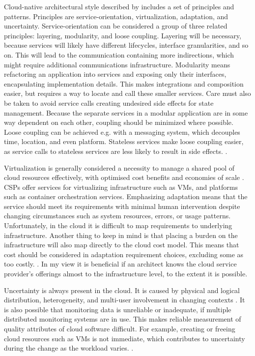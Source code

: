 \documentclass[utf8,english]{gradu3}
\begin{document}
Cloud-native architectural style described by \textcite[5]{Pahl2018} includes a
set of principles and patterns. Principles are service-orientation,
virtualization, adaptation, and uncertainty. Service-orientation can be
considered a group of three related principles: layering, modularity, and loose
coupling. Layering will be necessary, because services will likely have
different lifecycles, interface granularities, and so on. This will lead to the
communication containing more indirections, which might require additional
communications infrastructure. Modularity means refactoring an application into
services and exposing only their interfaces, encapsulating implementation
details. This makes integrations and composition easier, but requires a way to
locate and call these smaller services. Care must also be taken to avoid service
calls creating undesired side effects for state management. Because the separate
services in a modular application are in some way dependent on each other,
coupling should be minimized where possible. Loose coupling can be achieved e.g.
with a messaging system, which decouples time, location, and even platform.
Stateless services make loose coupling easier, as service calls to stateless
services are less likely to result in side effects. \parencite[3-8]{Pahl2018}.

Virtualization is generally considered a necessity to manage a shared pool of
cloud resources effectively, with optimised cost benefits and economies of scale
\parencite[8]{Pahl2018}. CSPs offer services for virtualizing
infrastructure such as VMs, and platforms such as container orchestration services.
Emphasizing adaptation means that the service should meet its requirements with
minimal human intervention despite changing circumstances such as system
resources, errors, or usage patterns. Unfortunately, in the cloud it is
difficult to map requirements to underlying infrastructure. Another thing to
keep in mind is that placing a burden on the infrastructure will also map
directly to the cloud cost model. This means that cost should be considered in
adaptation requirement choices, excluding some as too costly.
\parencite[3-10]{Pahl2018}. In my view it is beneficial if an architect knows
the cloud service provider's offerings almost to the infrastructure level, to
the extent it is possible.

Uncertainty is always present in the cloud. It is caused by physical and logical
distribution, heterogeneity, and multi-user involvement in changing contexts
\parencite[3]{Pahl2018}. It is also possible that monitoring data is unreliable
or inadequate, if multiple distributed monitoring systems are in use. This makes
reliable measurement of quality attributes of cloud software difficult. For
example, creating or freeing cloud resources such as VMs is not
immediate, which contributes to uncertainty during the change as the workload
varies. \parencite[3-11]{Pahl2018}.
\end{document}
